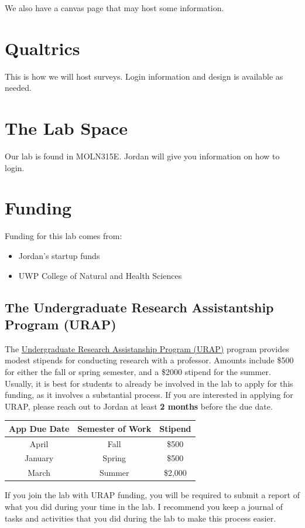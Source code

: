 \documentclass[
]{book}
\providecommand{\tightlist}{%
  \setlength{\itemsep}{0pt}\setlength{\parskip}{0pt}}
\begin{document}
We also have a canvas page that may host some information.

\hypertarget{qualtrics}{%
\section{Qualtrics}\label{qualtrics}}

This is how we will host surveys. Login information and design is available as needed.

\hypertarget{the-lab-space}{%
\section{The Lab Space}\label{the-lab-space}}

Our lab is found in MOLN315E. Jordan will give you information on how to login.

\hypertarget{funding}{%
\section{Funding}\label{funding}}

Funding for this lab comes from:

\begin{itemize}
\tightlist
\item
  Jordan's startup funds
\item
  UWP College of Natural and Health Sciences
\end{itemize}

\hypertarget{URAP}{%
\subsection{The Undergraduate Research Assistantship Program (URAP)}\label{URAP}}

The \href{https://www.uwp.edu/explore/offices/researchadmin/urap.cfm}{Undergraduate Research Assistanship Program (URAP)} program provides modest stipends for conducting research with a professor. Amounts include \$500 for either the fall or spring semester, and a \$2000 stipend for the summer. Usually, it is best for students to already be involved in the lab to apply for this funding, as it involves a substantial process. If you are interested in applying for URAP, please reach out to Jordan at least \textbf{2 months} before the due date.

\begin{longtable}[]{@{}ccc@{}}
\toprule
App Due Date & Semester of Work & Stipend \\
\midrule
\endhead
April & Fall & \$500 \\
January & Spring & \$500 \\
March & Summer & \$2,000 \\
\bottomrule
\end{longtable}

If you join the lab with URAP funding, you will be required to submit a report of what you did during your time in the lab. I recommend you keep a journal of tasks and activities that you did during the lab to make this process easier.

  
\end{document}
